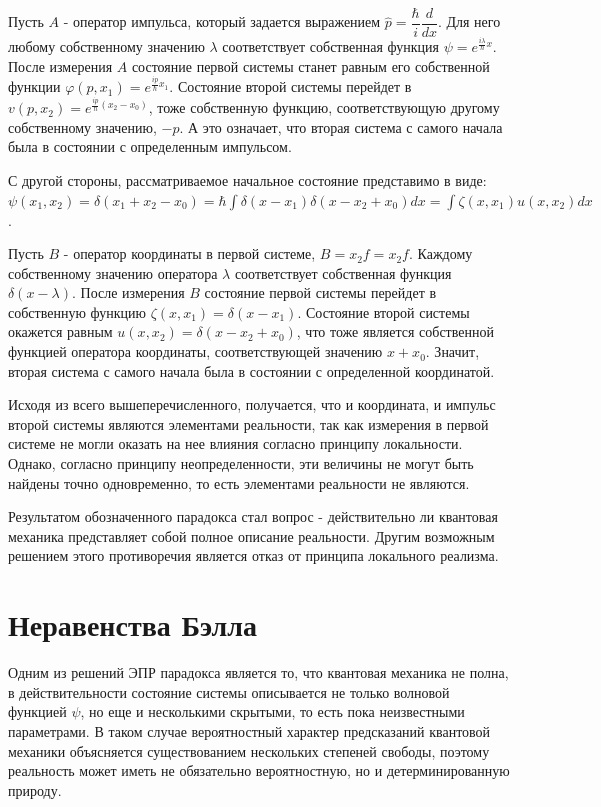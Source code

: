 \documentclass[%
master,         %
subf,           %
href,           %
colorlinks=true %
]{disser}
\numberwithin{equation}{section}
\numberwithin{figure}{section}
\begin{document}
Пусть $A$ - оператор импульса, который задается выражением $\hat{p} = \dfrac{\hbar}{i}\dfrac{d}{dx}$. Для него любому собственному значению $\lambda$ соответствует собственная функция $\psi = e^{\frac{i\lambda}{\hbar}x}$. После измерения $A$ состояние первой системы станет равным его собственной функции $\varphi(p, x_1) = e^{\frac{ip}{\hbar}x_1}$. Состояние второй системы перейдет в $v(p, x_2) = e^{\frac{ip}{\hbar}(x_2-x_0)}$, тоже собственную функцию, соответствующую другому собственному значению, $-p$. А это означает, что вторая система с самого начала была в состоянии с определенным импульсом.

С другой стороны, рассматриваемое начальное состояние представимо в виде: $\psi(x_1, x_2) = \delta(x_1 + x_2 - x_0) = \hbar\int\delta(x - x_1)\delta (x - x_2 + x_0)dx = \int\zeta(x, x_1)u(x, x_2)dx$. 

Пусть $B$ - оператор координаты в первой системе, $B = \hat{x_2}f = x_2f$. Каждому собственному значению оператора $\lambda$ соответствует собственная функция $\delta(x - \lambda)$. После измерения $B$ состояние первой системы перейдет в собственную функцию $\zeta(x, x_1) = \delta(x - x_1)$. Состояние второй системы окажется равным $u(x, x_2) = \delta(x - x_2 + x_0)$, что тоже является собственной функцией оператора координаты, соответствующей значению $x + x_0$. Значит, вторая система с самого начала была в состоянии с определенной координатой.

Исходя из всего вышеперечисленного, получается, что и координата, и импульс второй системы являются элементами реальности, так как измерения в первой системе не могли оказать на нее влияния согласно принципу локальности. Однако, согласно принципу неопределенности, эти величины не могут быть найдены точно одновременно, то есть элементами реальности не являются.

Результатом обозначенного парадокса стал вопрос - действительно ли квантовая механика представляет собой полное описание реальности. Другим возможным решением этого противоречия является отказ от принципа локального реализма.

\section{Неравенства Бэлла}
Одним из решений ЭПР парадокса является то, что квантовая механика не полна, в действительности состояние системы описывается не только волновой функцией  $\psi$, но еще и несколькими скрытыми, то есть пока неизвестными параметрами. В таком случае вероятностный характер предсказаний квантовой механики объясняется существованием нескольких степеней свободы, поэтому реальность может иметь не обязательно вероятностную, но и детерминированную природу.
\end{document}
